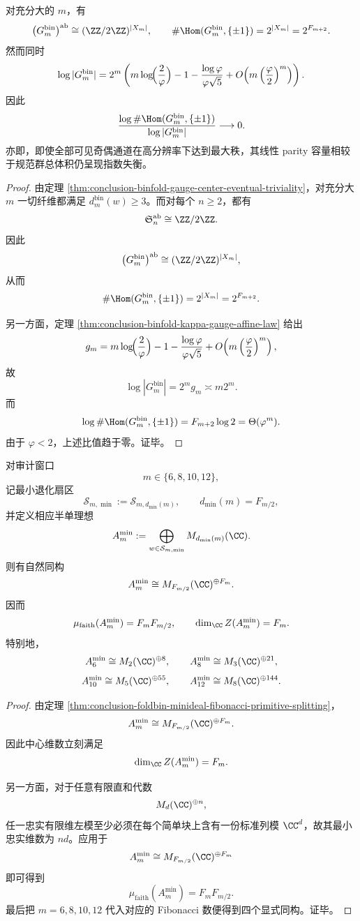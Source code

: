 \begin{corollary}[线性奇偶容量与规范体积的指数失衡]\label{cor:conclusion-binfold-linear-parity-volume-imbalance}
对充分大的 \(m\)，有
\[
\bigl(G_m^{\mathrm{bin}}\bigr)^{\mathrm{ab}}\cong (\ZZ/2\ZZ)^{|X_m|},
\qquad
\#\Hom(G_m^{\mathrm{bin}},\{\pm1\})=2^{|X_m|}=2^{F_{m+2}}.
\]
然而同时
\[
\log |G_m^{\mathrm{bin}}|
=
2^m\left(
m\log\!\Bigl(\frac{2}{\varphi}\Bigr)
-1-\frac{\log\varphi}{\varphi\sqrt5}
+O\!\left(m\left(\frac{\varphi}{2}\right)^m\right)
\right).
\]
因此
\[
\frac{\log \#\Hom(G_m^{\mathrm{bin}},\{\pm1\})}{\log |G_m^{\mathrm{bin}}|}
\longrightarrow 0.
\]
亦即，即使全部可见奇偶通道在高分辨率下达到最大秩，其线性 parity 容量相较于规范群总体积仍呈现指数失衡。
\end{corollary}
\begin{proof}
由定理 \ref{thm:conclusion-binfold-gauge-center-eventual-triviality}，对充分大 \(m\) 一切纤维都满足 \(d_m^{\mathrm{bin}}(w)\ge 3\)。而对每个 \(n\ge 2\)，都有
\[
\mathfrak S_n^{\mathrm{ab}}\cong \ZZ/2\ZZ.
\]
因此
\[
\bigl(G_m^{\mathrm{bin}}\bigr)^{\mathrm{ab}}
\cong
(\ZZ/2\ZZ)^{|X_m|},
\]
从而
\[
\#\Hom(G_m^{\mathrm{bin}},\{\pm1\})
=
2^{|X_m|}
=
2^{F_{m+2}}.
\]

另一方面，定理 \ref{thm:conclusion-binfold-kappa-gauge-affine-law} 给出
\[
g_m
=
m\log\!\Bigl(\frac{2}{\varphi}\Bigr)
-1-\frac{\log\varphi}{\varphi\sqrt5}
+O\!\left(m\left(\frac{\varphi}{2}\right)^m\right),
\]
故
\[
\log |G_m^{\mathrm{bin}}|=2^m g_m\asymp m2^m.
\]
而
\[
\log \#\Hom(G_m^{\mathrm{bin}},\{\pm1\})
=
F_{m+2}\log 2
=
\Theta(\varphi^m).
\]
由于 \(\varphi<2\)，上述比值趋于零。证毕。
\end{proof}

\begin{theorem}\label{thm:conclusion-audited-even-window-fibonacci-minideal-faithful-center}
对审计窗口
\[
m\in\{6,8,10,12\},
\]
记最小退化扇区
\[
\mathcal S_{m,\min}:=\mathcal S_{m,d_{\min}(m)},
\qquad
d_{\min}(m)=F_{m/2},
\]
并定义相应半单理想
\[
A_m^{\min}
:=
\bigoplus_{w\in \mathcal S_{m,\min}} M_{d_{\min}(m)}(\CC).
\]
则有自然同构
\[
A_m^{\min}\cong M_{F_{m/2}}(\CC)^{\oplus F_m}.
\]
因而
\[
\mu_{\mathrm{faith}}(A_m^{\min})=F_mF_{m/2},
\qquad
\dim_{\CC}Z(A_m^{\min})=F_m.
\]
特别地，
\[
A_6^{\min}\cong M_2(\CC)^{\oplus 8},\qquad
A_8^{\min}\cong M_3(\CC)^{\oplus 21},
\]
\[
A_{10}^{\min}\cong M_5(\CC)^{\oplus 55},\qquad
A_{12}^{\min}\cong M_8(\CC)^{\oplus 144}.
\]
\end{theorem}
\begin{proof}
由定理 \ref{thm:conclusion-foldbin-minideal-fibonacci-primitive-splitting}，
\[
A_m^{\min}\cong M_{F_{m/2}}(\CC)^{\oplus F_m}.
\]
因此中心维数立刻满足
\[
\dim_{\CC}Z(A_m^{\min})=F_m.
\]

另一方面，对于任意有限直和代数
\[
M_d(\CC)^{\oplus n},
\]
任一忠实有限维左模至少必须在每个简单块上含有一份标准列模 \(\CC^d\)，故其最小忠实维数为 \(nd\)。应用于
\[
A_m^{\min}\cong M_{F_{m/2}}(\CC)^{\oplus F_m}
\]
即可得到
\[
\mu_{\mathrm{faith}}(A_m^{\min})=F_mF_{m/2}.
\]
最后把 \(m=6,8,10,12\) 代入对应的 Fibonacci 数便得到四个显式同构。证毕。
\end{proof}

